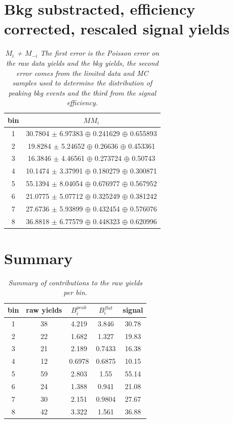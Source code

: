 \section{Bkg substracted, efficiency corrected, rescaled signal yields}
\begin{table}[!h]
	\begin{center}
		\begin{tabular}{c| c }
			bin & $MM_i$  \\
			\hline
1 & 30.7804 $\pm$ 6.97383 $\oplus$ 0.241629 $\oplus$ 0.655893 \\ 
2 & 19.8284 $\pm$ 5.24652 $\oplus$ 0.26636 $\oplus$ 0.453361 \\ 
3 & 16.3846 $\pm$ 4.46561 $\oplus$ 0.273724 $\oplus$ 0.50743 \\ 
4 & 10.1474 $\pm$ 3.37991 $\oplus$ 0.180279 $\oplus$ 0.300871 \\ 
5 & 55.1394 $\pm$ 8.04054 $\oplus$ 0.676977 $\oplus$ 0.567952 \\ 
6 & 21.0775 $\pm$ 5.07712 $\oplus$ 0.325249 $\oplus$ 0.381242 \\ 
7 & 27.6736 $\pm$ 5.93899 $\oplus$ 0.432454 $\oplus$ 0.576076 \\ 
8 & 36.8818 $\pm$ 6.77579 $\oplus$ 0.448323 $\oplus$ 0.620996 \\ 
	\end{tabular}
\end{center}
\vspace*{-0.5cm}
\caption{\textit{$M_i$ + $M_{-i}$ The first error is the Poisson error on the raw data yields and the bkg yields, the second error comes from the limited data and MC samples used to determine the distribution of peaking bkg events and the third from the signal efficiency.}}
\label{tab:MMKs}
\end{table} 

\section{Summary}
\begin{table}[!h]
	\begin{center}
		\begin{tabular}{c| c | c | c|c}
		bin & raw yields & $B^{peak}_i$ & $B^{flat}_i$ &  signal  \\
		\hline 
		\hline
1 & 38 & 4.219 & 3.846 & 30.78 \\ 
2 & 22 & 1.682 & 1.327 & 19.83 \\ 
3 & 21 & 2.189 & 0.7433 & 16.38 \\ 
4 & 12 & 0.6978 & 0.6875 & 10.15 \\ 
5 & 59 & 2.803 & 1.55 & 55.14 \\ 
6 & 24 & 1.388 & 0.941 & 21.08 \\ 
7 & 30 & 2.151 & 0.9804 & 27.67 \\ 
8 & 42 & 3.322 & 1.561 & 36.88 \\ 
		\end{tabular}
	\end{center}
	\caption{\textit{Summary of contributions to the raw yields per bin.}}
\end{table}


